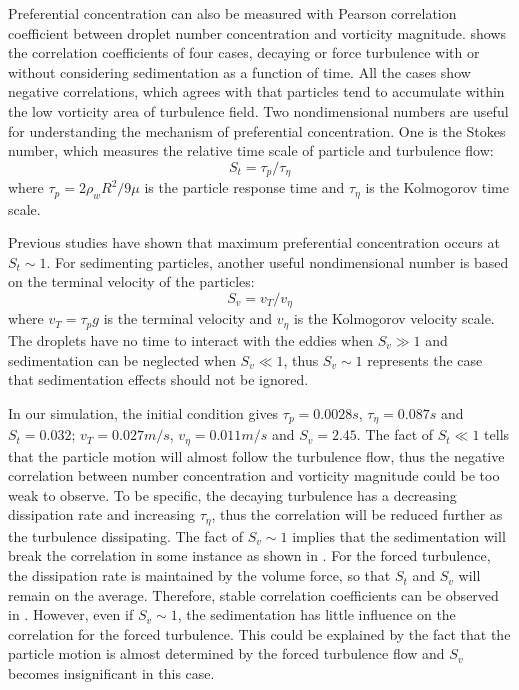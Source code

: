 Preferential concentration can also be measured with Pearson correlation
coefficient between droplet number concentration and vorticity magnitude.
 shows the correlation coefficients of four cases,
decaying or force turbulence with or without considering sedimentation as a
function of time. All the cases show negative correlations, which agrees with
that particles tend to accumulate within the low vorticity area of turbulence
field. Two nondimensional numbers are useful for understanding the mechanism of
preferential concentration. One is the Stokes number, which measures the
relative time scale of particle and turbulence flow:
\begin{equation}
S_t = \tau_p/\tau_{\eta}
\end{equation}
where $\tau_p = 2\rho_wR^2/9\mu$ is the particle response time and
$\tau_{\eta}$ is the Kolmogorov time scale.

Previous studies \cite{grabowski1999comments,vaillancourt2000review} have shown
that maximum preferential concentration occurs at $S_t \sim 1$. For sedimenting
particles, another useful nondimensional number is based on the terminal
velocity of the particles:
\begin{equation}
S_v = v_T/v_{\eta}
\end{equation}
where $v_T = \tau_p g$ is the terminal velocity and $v_{\eta}$ is the
Kolmogorov velocity scale. The droplets have no time to interact with the
eddies when $S_v \gg 1$ and sedimentation can be neglected when $S_v \ll 1$,
thus $S_v \sim 1$ represents the case that sedimentation effects should not be
ignored.

In our simulation, the initial condition gives $\tau_p = 0.0028 s$, $\tau_\eta
= 0.087s$ and $S_t = 0.032$; $v_T = 0.027 m/s$, $v_{\eta} = 0.011 m/s$ and $S_v
= 2.45$. The fact of $S_t \ll 1$ tells that the particle motion will almost
follow the turbulence flow, thus the negative correlation between number
concentration and vorticity magnitude could be too weak to observe. To be
specific, the decaying turbulence has a decreasing dissipation rate and
increasing $\tau_{\eta}$, thus the correlation will be reduced further as the
turbulence dissipating. The fact of $S_v \sim 1$ implies that the sedimentation
will break the correlation in some instance as shown in .
For the forced turbulence, the dissipation rate is maintained by the volume
force, so that $S_t$ and $S_v$ will remain on the average. Therefore, stable
correlation coefficients can be observed in . However,
even if $S_v \sim 1$, the sedimentation has little influence on the correlation
for the forced turbulence. This could be explained by the fact that the
particle motion is almost determined by the forced turbulence flow and $S_v$
becomes insignificant in this case.

